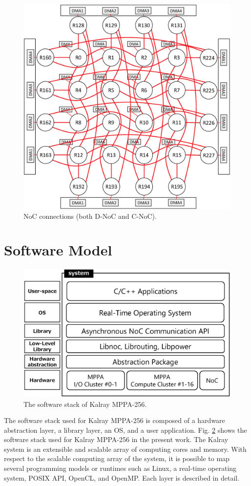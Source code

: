 \clearpage
\begin{figure}[!htbp]
  \centering
  \includegraphics[width=0.7\linewidth]{../figure/noc_map.eps}
      \caption{\label{fig:noc_map}
    NoC connections (both D-NoC and C-NoC).}
\end{figure}
\clearpage

\section{Software Model}
\label{sec:software_model}

\begin{figure}[!htbp]
  \centering
  \includegraphics[width=0.7\linewidth]{../figure/softwarestack.eps}   
  \caption{\label{fig:software_stack}
    The software stack of Kalray MPPA-256.}     
\end{figure}

The software stack used for Kalray MPPA-256 is composed of a hardware abstraction layer, a library layer, an OS, and a user application.  
Fig. \ref{fig:software_stack} shows the software stack used for Kalray MPPA-256 in the present work.
The Kalray system is an extensible and scalable array of computing cores and memory.
With respect to the scalable computing array of the system, it is possible to map several programming models or runtimes such as Linux, a real-time operating system, POSIX API, OpenCL, and OpenMP.
Each layer is described in detail.

